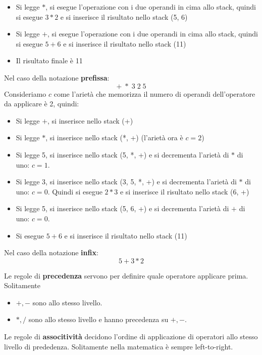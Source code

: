 \documentclass[a4paper]{article}
\begin{document}
\begin{itemize}
\begin{itemize}
{\begin{itemize}
                \item Si legge \(*\), si esegue l'operazione con i due operandi in cima allo stack, quindi si esegue \( 3 * 2 \) e si inserisce il risultato nello stack (5, 6)
                \item Si legge \( + \), si esegue l'operazione con i due operandi in cima allo stack, quindi si esegue \( 5 + 6 \) e si inserisce il risultato nello stack (11)
                \item Il risultato finale è 11 
            \end{itemize}
        }
        \ex{}
        {
            Nel caso della notazione \textbf{prefissa}:
            \[
            + \; * \;  3  \; 2 \; 5
            \]
            Consideriamo $c$ come l'arietà che memorizza il numero di operandi dell'operatore da applicare è 2, quindi:
            \begin{itemize}
                \item Si legge \( + \), si inserisce nello stack (+) 
                \item Si legge \(*\), si inserisce nello stack (*, +) (l'arietà ora è $c = 2$)
                \item Si legge 5, si inserisce nello stack (5, *, +) e si decrementa l'arietà di \(*\) di uno: $c = 1$.
                \item Si legge 3, si inserisce nello stack (3, 5, *, +) e si decrementa l'arietà di \(*\) di uno: $c = 0$.
                Quindi si esegue \( 2 * 3 \) e si inserisce il risultato nello stack (6, +)
                \item Si legge 5, si inserisce nello stack (5, 6, +) e si decrementa l'arietà di \( + \) di uno: $c = 0$.
                \item Si esegue \( 5 + 6 \) e si inserisce il risultato nello stack (11)
            \end{itemize}
        }
        \ex{}
        {
            Nel caso della notazione \textbf{infix}:
            \[
            5 + 3 * 2
            \]

            Le regole di \textbf{precedenza} servono per definire quale operatore applicare prima.
            Solitamente 
            \begin{itemize}
                \item $+, -$ sono allo stesso livello. 
                \item $*, /$ sono allo stesso livello e hanno precedenza su $+, -$.
            \end{itemize}
            Le regole di \textbf{associtività} decidono l'ordine di 
            applicazione di operatori allo stesso livello di prededenza. Solitamente nella matematica
            è sempre left-to-right.
        }
    \end{itemize}


\end{itemize}
\end{document}
